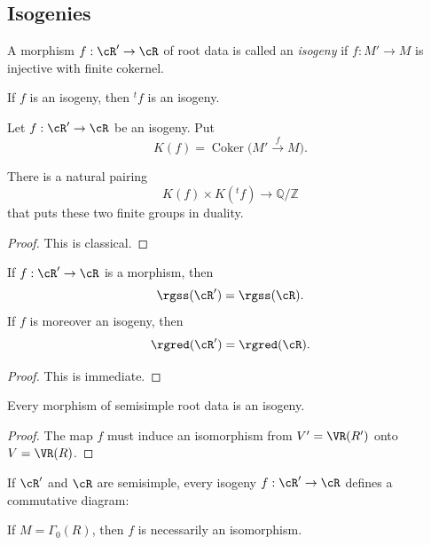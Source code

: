 \subsection{Isogenies}\label{sga3:XXI:6.2}

\begin{definition}\label{sga3:XXI:6.2.1}
A morphism \(f:\cR'\to\cR\) of root data is called an
\emph{isogeny} if \(f:M'\to M\) is injective with finite cokernel.
\end{definition}

If \(f\) is an isogeny, then \({}^tf\) is an isogeny.

\begin{definition}\label{sga3:XXI:6.2.2}
Let \(f:\cR'\to\cR\) be an isogeny. Put
\[
 K(f)=\operatorname{Coker}\bigl(M'\xrightarrow{f}M\bigr).
\]
\end{definition}

\begin{lemma}\label{sga3:XXI:6.2.3}
There is a natural pairing
\[
 K(f)\times K({}^tf)\longrightarrow\mathbb Q/\mathbb Z
\]
that puts these two finite groups in duality.
\end{lemma}

\begin{proof}
This is classical.
\end{proof}

\begin{lemma}\label{sga3:XXI:6.2.4}
If \(f:\cR'\to\cR\) is a morphism, then
\[
 \rgss(\cR')=\rgss(\cR).
\]
If \(f\) is moreover an isogeny, then
\[
 \rgred(\cR')=\rgred(\cR).
\]
\end{lemma}

\begin{proof}
This is immediate.
\end{proof}

\begin{lemma}\label{sga3:XXI:6.2.5}
Every morphism of semisimple root data is an isogeny.
\end{lemma}

\begin{proof}
The map \(f\) must induce an isomorphism from
\(V'=\VR(R')\) onto \(V=\VR(R)\).
\end{proof}

If \(\cR'\) and \(\cR\) are semisimple, every isogeny
\(f:\cR'\to\cR\) defines a commutative diagram:
\begin{center}
\end{center}
If \(M=\Gamma_0(R)\), then \(f\) is necessarily an isomorphism.

